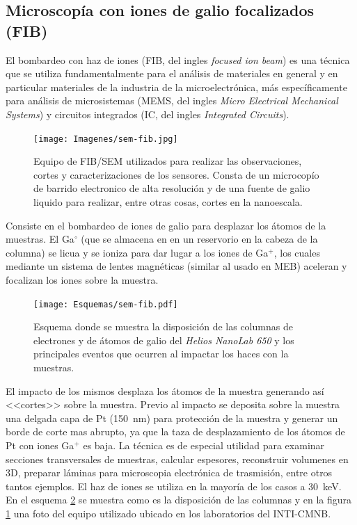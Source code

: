 	\subsection{Microscopía con iones de galio focalizados (FIB)}\label{sec:FIB}

		El bombardeo con haz de iones (FIB, del ingles \textit{focused ion beam}) es una técnica que se utiliza fundamentalmente para el análisis de materiales en general y en particular materiales de la industria de la microelectrónica, más específicamente para análisis de microsistemas (MEMS, del ingles \textit{Micro Electrical Mechanical Systems}) y circuitos integrados (IC, del ingles \textit{Integrated Circuits}).

			\begin{figure}[ht]
			 		  \begin{center}
			 		  \texttt{[image: Imagenes/sem-fib.jpg]}
			 		  \caption[Microscopio de doble haz FIB/SEM]{Equipo de FIB/SEM utilizados para realizar las observaciones, cortes y caracterizaciones de los sensores. Consta de un microcopío de barrido electronico de alta resolución y de una fuente de galio liquido para realizar, entre otras cosas, cortes en la nanoescala.}
			 		  \label{fig:sem-fib}
			 		  \end{center}
			 		  \end{figure}

		Consiste en el bombardeo de iones de galio para desplazar los átomos de la muestras. El Ga$^{\circ}$ (que se almacena en en un reservorio en la cabeza de la columna) se licua y se ioniza para dar lugar a los iones de Ga${^+}$, los cuales mediante un sistema de lentes magnéticas (similar al usado en MEB)  aceleran y focalizan los iones sobre la muestra. 

		\begin{figure}[ht!]
			 		  \begin{center}
			 		  \texttt{[image: Esquemas/sem-fib.pdf]}
			 		  \caption[Esquema de las microscopias FIB/SEM]{Esquema donde se muestra la disposición de las columnas de electrones y de átomos de galio del \textit{Helios NanoLab 650} y los principales eventos que ocurren al impactar los haces con la muestras.}
			 		  \label{esq:sem-fib}
			 		  \end{center}
			 		  \end{figure}

		El impacto de los mismos desplaza los átomos de la muestra generando así <<cortes>> sobre la muestra. Previo al impacto se deposita sobre la muestra una delgada capa de Pt (\SI{150}{\nm}) para protección de la muestra y generar un borde de corte mas abrupto, ya que la taza de desplazamiento de los átomos de Pt con iones Ga${^+}$ es baja.\cite{Giannuzzi2005} La técnica es de especial utilidad para examinar secciones transversales de muestras, calcular espesores, reconstruir volumenes en 3D, preparar láminas para microscopia electrónica de trasmisión, entre otros tantos ejemplos. El haz de iones se utiliza en la mayoría de los casos a \SI{30}{\kilo\electronvolt}. En el esquema \ref{esq:sem-fib} se muestra como es la disposición de las columnas y en la figura \ref{fig:sem-fib} una foto del equipo utilizado ubicado en los laboratorios del INTI-CMNB.

